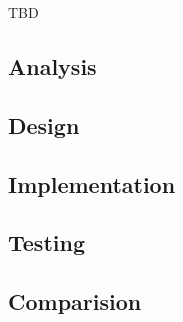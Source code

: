 \documentclass[../main.tex]{subfiles}
\begin{document}
TBD

\subsection{Analysis}


\subsection{Design}


\subsection{Implementation}


\subsection{Testing}


\subsection{Comparision}

\end{document}
